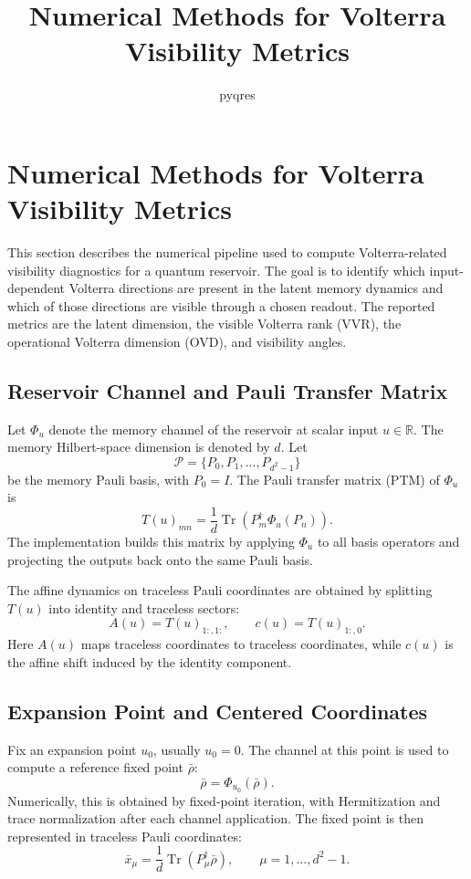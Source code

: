 \documentclass[11pt]{article}
\title{Numerical Methods for Volterra Visibility Metrics}
\author{pyqres}
\date{}
\newcommand{\Tr}{\operatorname{Tr}}
\begin{document}
\maketitle

\section{Numerical Methods for Volterra Visibility Metrics}

This section describes the numerical pipeline used to compute Volterra-related
visibility diagnostics for a quantum reservoir.  The goal is to identify which
input-dependent Volterra directions are present in the latent memory dynamics
and which of those directions are visible through a chosen readout.  The
reported metrics are the latent dimension, the visible Volterra rank (VVR), the
operational Volterra dimension (OVD), and visibility angles.

\subsection{Reservoir Channel and Pauli Transfer Matrix}

Let $\Phi_u$ denote the memory channel of the reservoir at scalar input
$u \in \mathbb{R}$.  The memory Hilbert-space dimension is denoted by $d$.
Let
\[
    \mathcal{P} = \{P_0, P_1, \ldots, P_{d^2-1}\}
\]
be the memory Pauli basis, with $P_0 = I$.  The Pauli transfer matrix (PTM) of
$\Phi_u$ is
\[
    T(u)_{mn}
    =
    \frac{1}{d}\Tr\!\left(P_m^\dagger \Phi_u(P_n)\right).
\]
The implementation builds this matrix by applying $\Phi_u$ to all basis
operators and projecting the outputs back onto the same Pauli basis.

The affine dynamics on traceless Pauli coordinates are obtained by splitting
$T(u)$ into identity and traceless sectors:
\[
    A(u) = T(u)_{1:,1:},
    \qquad
    c(u) = T(u)_{1:,0}.
\]
Here $A(u)$ maps traceless coordinates to traceless coordinates, while $c(u)$ is
the affine shift induced by the identity component.

\subsection{Expansion Point and Centered Coordinates}

Fix an expansion point $u_0$, usually $u_0 = 0$.  The channel at this point is
used to compute a reference fixed point $\bar{\rho}$:
\[
    \bar{\rho} = \Phi_{u_0}(\bar{\rho}).
\]
Numerically, this is obtained by fixed-point iteration, with Hermitization and
trace normalization after each channel application.  The fixed point is then
represented in traceless Pauli coordinates:
\[
    \bar{x}_\mu
    =
    \frac{1}{d}\Tr(P_\mu^\dagger \bar{\rho}),
    \qquad
    \mu = 1,\ldots,d^2-1.
\]
\end{document}
